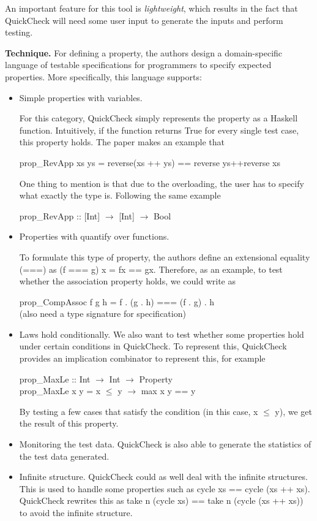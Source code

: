 \documentclass[12pt]{article}
\begin{document}
An important feature for this tool is \textit{lightweight}, which results in the fact that QuickCheck will need some user input to generate the inputs and perform testing.

\noindent
\textbf{Technique.} For defining a property, the authors design a domain-specific language of testable specifications for programmers to specify expected properties. More specifically, this language supports:
\begin{itemize}
\item Simple properties with variables.

For this category, QuickCheck simply represents the property as a Haskell function. Intuitively, if the function returns True for every single test case, this property holds. The paper makes an example that
\begin{center}
	prop\_RevApp xs ys = reverse(xs ++ ys) == reverse ys++reverse xs
\end{center}

One thing to mention is that due to the overloading, the user has to specify what exactly the type is. Following the same example
\begin{center}
	prop\_RevApp :: [Int] $\rightarrow$ [Int] $\rightarrow$ Bool
\end{center}
\item Properties with quantify over functions.

To formulate this type of property, the authors define an extensional equality (===) as (f === g) x = fx == gx. Therefore, as an example, to test whether the association property holds, we could write as
\begin{center}
	prop\_CompAssoc f g h = f . (g . h) === (f . g) . h \\
	(also need a type signature for specification)
\end{center}


\item Laws hold conditionally.
We also want to test whether some properties hold under certain conditions in QuickCheck. To represent this, QuickCheck provides an implication combinator to represent this, for example
\begin{center}
prop\_MaxLe :: Int $\rightarrow$ Int $\rightarrow$ Property\\
prop\_MaxLe x y = x $\leq$ y $\rightarrow$ max x y == y
\end{center}
By testing a few cases that satisfy the condition (in this case, x $\leq$ y), we get the result of this property.
\item Monitoring the test data.
QuickCheck is also able to generate the statistics of the test data generated.

\item Infinite structure.
QuickCheck could as well deal with the infinite structures. This is used to handle some properties such as cycle xs == cycle (xs ++ xs). QuickCheck rewrites this as take n (cycle xs) == take n (cycle (xs ++ xs)) to avoid the infinite structure.
\end{itemize}
\end{document}
